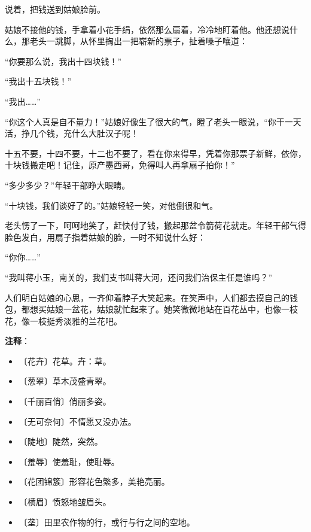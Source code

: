 \documentclass[12pt,UTF-8,openany]{ctexbook}
\begin{document}
\begin{normalsize}
    说着，把钱送到姑娘脸前。
    
    姑娘不接他的钱，手拿着小花手绢，依然那么扇着，冷冷地盯着他。他还想说什么，那老头一跳脚，从怀里掏出一把崭新的票子，扯着嗓子嚷道：
    
    “你要那么说，我出十四块钱！”
    
    “我出十五块钱！”
    
    “我出……”
    
    “你这个人真是自不量力！”姑娘好像生了很大的气，瞪了老头一眼说，“你干一天活，挣几个钱，充什么大肚汉子呢！
    
    十五不要，十四不要，十二也不要了，看在你来得早，凭着你那票子新鲜，依你，十块钱搬走吧！记住，原产墨西哥，免得叫人再拿扇子拍你！”
    
    “多少多少？”年轻干部睁大眼睛。
    
    “十块钱，我们谈好了的。”姑娘轻轻一笑，对他倒很和气。
    
    老头愣了一下，呵呵地笑了，赶快付了钱，搬起那盆令箭荷花就走。年轻干部气得脸色发白，用扇子指着姑娘的脸，一时不知说什么好：
    
    “你你……”
    
    “我叫蒋小玉，南关的，我们支书叫蒋大河，还问我们治保主任是谁吗？”
    
    人们明白姑娘的心思，一齐仰着脖子大笑起来。在笑声中，人们都去摸自己的钱包，都想买姑娘一盆花，姑娘就忙起来了。她笑微微地站在百花丛中，也像一枝花，像一枝挺秀淡雅的兰花吧。
    
\end{normalsize}


\newpage

\textbf{注释}：

\vspace{-1em}

\begin{itemize}
    \setlength\itemsep{-0.2em}
    \item 〔花卉〕花草。卉：草。
    \item 〔葱翠〕草木茂盛青翠。
    \item 〔千丽百俏〕俏丽多姿。
    \item 〔无可奈何〕不情愿又没办法。
    \item 〔陡地〕陡然，突然。
    \item 〔羞辱〕使羞耻，使耻辱。
    \item 〔花团锦簇〕形容花色繁多，美艳亮丽。
    \item 〔横眉〕愤怒地皱眉头。
    \item 〔垄〕田里农作物的行，或行与行之间的空地。
\end{itemize}
\end{document}
